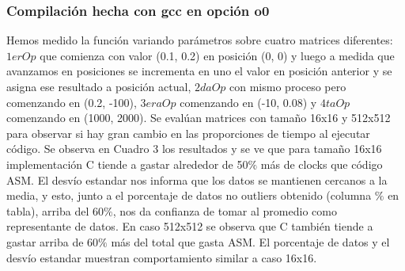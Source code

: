 \subsubsection{Compilación hecha con gcc en opción o0}
Hemos medido la función variando parámetros sobre cuatro matrices diferentes: $1erOp$ que comienza con valor (0.1, 0.2) en posición (0, 0) y luego a medida que avanzamos en posiciones se incrementa en uno el valor en posición anterior y se asigna ese resultado a posición actual, $2daOp$ con mismo proceso pero comenzando en (0.2, -100), $3eraOp$ comenzando en (-10, 0.08) y $4taOp$ comenzando en (1000, 2000). Se evalúan matrices con tamaño 16x16 y 512x512 para observar si hay gran cambio en las proporciones de tiempo al ejecutar código. Se observa en Cuadro 3 los resultados y se ve que para tamaño 16x16 implementación C tiende a gastar alrededor de 50$\%$ más de clocks que código ASM.
El desvío estandar nos informa que los datos se mantienen cercanos a la media, y esto, junto a el porcentaje de datos no outliers obtenido (columna $\%$ en tabla), arriba del 60$\%$, nos da confianza de tomar al promedio como representante de datos. En caso 512x512 se observa que C también tiende a gastar arriba de 60$\%$ más del total que gasta ASM. El porcentaje de datos y el desvío estandar muestran comportamiento similar a caso 16x16. 
  
